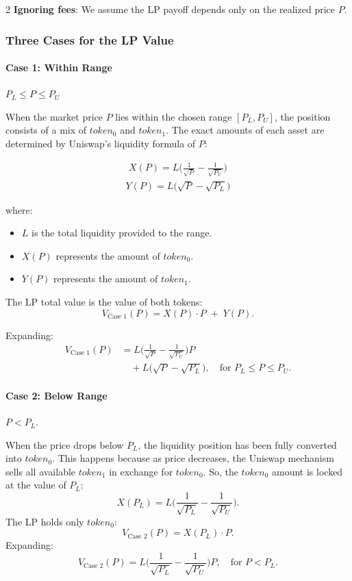 \documentclass[10pt]{article}
\begin{document}
\begin{multicols}{2}
\textbf{Ignoring fees}: We assume the LP payoff depends only on the realized price $P$.

\subsubsection{Three Cases for the LP Value}

\paragraph{Case 1: Within Range} $P_L \le P \le P_U$
 
\smallskip

When the market price $P$ lies within the chosen range $[P_L, P_U]$, the position consists of a mix of $token_0$ and $token_1$. The exact amounts of each asset are determined by Uniswap's liquidity formula of $P$:

\begin{align*}
X(P) = L \biggl(\frac{1}{\sqrt{P}} - \frac{1}{\sqrt{P_U}}\biggr)
\end{align*}
\begin{align*}
Y(P) = L \bigl(\sqrt{P} - \sqrt{P_L}\bigr)
\end{align*}

where:
\begin{itemize}
	\item $L$ is the total liquidity provided to the range.
	\item $X(P)$ represents the amount of $token_0$.
	\item $Y(P)$ represents the amount of $token_1$.
\end{itemize}

The LP total value is the value of both tokens:
\[
V_{\text{Case 1}}(P) = X(P) \cdot P \;+\; Y(P).
\]

Expanding:
\begin{align*}
V_{\text{Case 1}}(P) &= L \biggl(\frac{1}{\sqrt{P}} - \frac{1}{\sqrt{P_U}}\biggr) P \\
&\quad + L \bigl(\sqrt{P} - \sqrt{P_L}\bigr),
\quad \text{for } P_L \le P \le P_U.
\end{align*}

\paragraph{Case 2: Below Range} $P < P_L$.
 
\smallskip

When the price drops below $P_L$, the liquidity position has been fully converted into $token_0$. This happens because as price decreases, the Uniswap mechanism sells all available $token_1$ in exchange for $token_0$. So, the $token_0$ amount is locked at the value of $P_L$:
\[
X(P_L) = L \biggl(\frac{1}{\sqrt{P_L}} - \frac{1}{\sqrt{P_U}}\biggr).
\]
The LP holds only $token_0$:
\[
V_{\text{Case 2}}(P) = X(P_L) \cdot P.
\]
Expanding:
\[
V_{\text{Case 2}}(P) = L \biggl(\frac{1}{\sqrt{P_L}} - \frac{1}{\sqrt{P_U}}\biggr) P,
\quad \text{for } P < P_L.
\]


\end{multicols}
\end{document}
